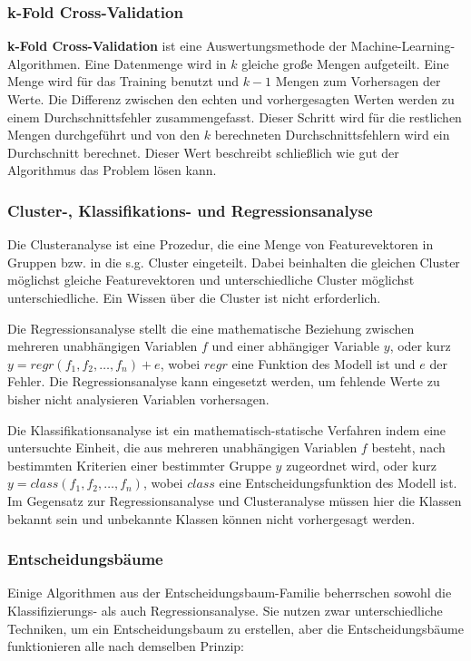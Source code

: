 \subsubsection{k-Fold Cross-Validation}
\textbf{k-Fold Cross-Validation} ist eine Auswertungsmethode der Machine-Learning-Algorithmen. 
Eine Datenmenge wird in $k$ gleiche große Mengen aufgeteilt. 
Eine Menge wird für das Training benutzt und $k-1$ Mengen zum Vorhersagen der Werte. 
Die Differenz zwischen den echten und vorhergesagten Werten werden zu einem Durchschnittsfehler zusammengefasst. 
Dieser Schritt wird für die restlichen Mengen durchgeführt und von den $k$ berechneten Durchschnittsfehlern wird ein Durchschnitt berechnet. 
Dieser Wert beschreibt schließlich wie gut der Algorithmus das Problem lösen kann.


\subsubsection{Cluster-, Klassifikations- und Regressionsanalyse}
Die Clusteranalyse ist eine Prozedur, die eine Menge von Featurevektoren in Gruppen bzw. in die s.g. Cluster eingeteilt. Dabei beinhalten die gleichen Cluster möglichst gleiche Featurevektoren und unterschiedliche Cluster möglichst unterschiedliche. Ein Wissen über die Cluster ist nicht erforderlich.

Die Regressionsanalyse stellt die eine mathematische Beziehung zwischen mehreren unabhängigen Variablen $f$ und einer abhängiger Variable $y$, oder kurz $y = regr(f_1, f_2, \dots, f_n) + e$, wobei $regr$ eine Funktion des Modell ist und $e$ der Fehler.
Die Regressionsanalyse kann eingesetzt werden, um fehlende Werte zu bisher nicht analysieren Variablen vorhersagen.

Die Klassifikationsanalyse ist ein mathematisch-statische Verfahren indem eine untersuchte Einheit, die aus mehreren unabhängigen Variablen $f$ besteht, nach bestimmten Kriterien einer bestimmter Gruppe $y$ zugeordnet wird, oder kurz $y = class(f_1, f_2, \dots, f_n)$, wobei $class$ eine Entscheidungsfunktion des Modell ist. Im Gegensatz zur Regressionsanalyse und Clusteranalyse müssen hier die Klassen bekannt sein und unbekannte Klassen können nicht vorhergesagt werden.


\subsubsection{Entscheidungsbäume}
Einige Algorithmen aus der Entscheidungsbaum-Familie beherrschen sowohl die Klassifizierungs- als auch Regressionsanalyse. 
Sie nutzen zwar unterschiedliche Techniken, um ein Entscheidungsbaum zu erstellen, aber die Entscheidungsbäume funktionieren alle nach demselben Prinzip: 

